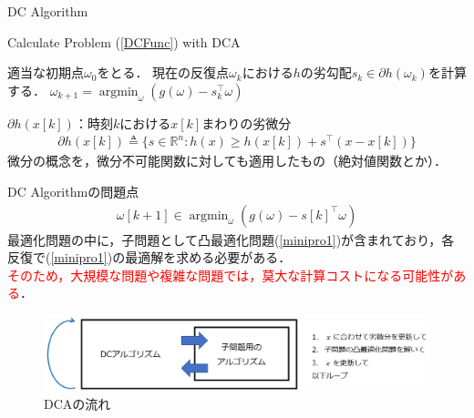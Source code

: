 \documentclass[aspectratio=169, dvipdfmx, 10.5pt]{beamer} %
\newcommand{\red}[1]{\textcolor{red}{#1}}
\DeclareMathOperator{\argmin}{argmin}
\begin{document}
\begin{frame}{DC Algorithm}
    \begin{algorithm}[H]
        \caption{Calculate Problem (\ref{DCFunc}) with DCA}
        \label{DCA}
        \begin{algorithmic}[1]
            \STATE 適当な初期点$\omega_0$をとる．
            \STATE 現在の反復点$\omega_k$における$h$の劣勾配$s_k \in \partial h(\omega_k)$を計算する．
            \STATE $\omega_{k+1} = \argmin_{\omega} \left(g(\omega) - s_k^{\top} \omega \right)$
            \ENDFOR
        \end{algorithmic}
    \end{algorithm}
    $\partial h(x[k])$：時刻$k$における$x[k]$まわりの劣微分
    \begin{align*}
        \partial h(x[k]) \triangleq \{ s \in \mathbb{R}^n : h(x) \geq h(x[k]) + s^\top (x - x[k]) \}
    \end{align*}
    微分の概念を，微分不可能関数に対しても適用したもの（絶対値関数とか）．
\end{frame}

\begin{frame}{DC Algorithmの問題点}
    \begin{align}
        \label{minipro1}
        \omega[k+1] \in \argmin_{\omega}\left(g(\omega) - s[k]^{\top}\omega\right)
    \end{align}
    最適化問題の中に，子問題として凸最適化問題(\ref{minipro1})が含まれており，各反復で(\ref{minipro1})の最適解を求める必要がある．\\

    \red{そのため，大規模な問題や複雑な問題では，莫大な計算コストになる可能性がある}．
    \begin{figure}
        \centering
        \includegraphics[keepaspectratio, scale=0.4]{DCDC.png}
        \caption{DCAの流れ}
    \end{figure}
\end{frame}
\end{document}

